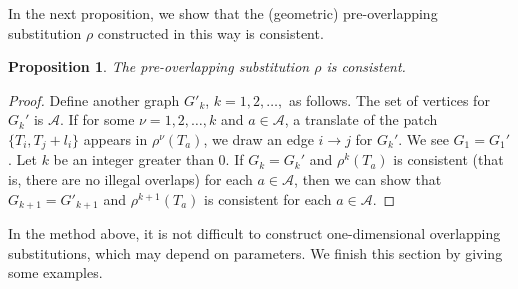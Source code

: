 \documentclass[a4]{amsart}
\DeclareMathOperator{\supp}{supp}
\DeclareMathOperator{\Int}{int}
\newtheorem{lem}[theorem]{Lemma}
\newtheorem{prop}[theorem]{Proposition}
\theoremstyle{definition}
\begin{document}
 In the next proposition, we show that the (geometric)
 pre-overlapping substitution $\rho$ constructed
in this way is consistent. 

 
 \begin{prop}
     The pre-overlapping substitution $\rho$ is consistent.
 \end{prop}
 \begin{proof}
     Define another graph
     $G'_k$, $k=1,2,\ldots,$ as follows.
     The set of vertices for $G_k'$ is $\mathcal{A}$. If
     for some $\nu=1,2,\ldots ,k$ and $a\in\mathcal{A}$, a translate of the patch $\{T_i,T_j+l_i\}$ appears in $\rho^{\nu}(T_a)$,
     we draw an edge $i\rightarrow j$ for
     $G_k'$. We see $G_1=G_1'$.
     Let $k$ be an integer greater than 0. If $G_k=G_k'$ and
     $\rho^k(T_a)$ is consistent (that is, there are no illegal overlaps) for each $a\in\mathcal{A}$, then we can show that
     $G_{k+1}=G'_{k+1}$ and
     $\rho^{k+1}(T_a)$ is
     consistent for each $a\in\mathcal{A}.$
 \end{proof}

 In the method above, it is not difficult to construct one-dimensional overlapping substitutions, which may depend on parameters. We finish this section by giving some examples.
\end{document}
